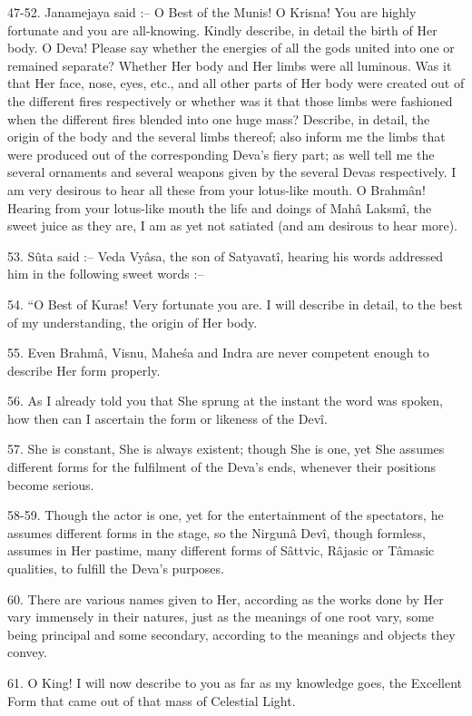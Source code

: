 47-52. Janamejaya said :-- O Best of the Munis! O Krisna! You are highly fortunate and you are all-knowing. Kindly describe, in detail the birth of Her body. O Deva! Please say whether the energies of all the gods united into one or remained separate? Whether Her body and Her limbs were all luminous. Was it that Her face, nose, eyes, etc., and all other parts of Her body were created out of the different fires respectively or whether was it that those limbs were fashioned when the different fires blended into one huge mass? Describe, in detail, the origin of the body and the several limbs thereof; also inform me the limbs that were produced out of the corresponding Deva's fiery part; as well tell me the several ornaments and several weapons given by the several Devas respectively. I am very desirous to hear all these from your lotus-like mouth. O Brahm\^an! Hearing from your lotus-like mouth the life and doings of Mah\^a Laksm\^i, the sweet juice as they are, I am as yet not satiated (and am desirous to hear more).

53. S\^uta said :-- Veda Vy\^asa, the son of Satyavat\^i, hearing his words addressed him in the following sweet words :--

54. ``O Best of Kuras! Very fortunate you are. I will describe in detail, to the best of my understanding, the origin of Her body.

55. Even Brahm\^a, Visnu, Mahe\'sa and Indra are never competent enough to describe Her form properly.

56. As I already told you that She sprung at the instant the word was spoken, how then can I ascertain the form or likeness of the Dev\^i.

57. She is constant, She is always existent; though She is one, yet She assumes different forms for the fulfilment of the Deva's ends, whenever their positions become serious.

58-59. Though the actor is one, yet for the entertainment of the spectators, he assumes different forms in the stage, so the Nirgun\^a Dev\^i, though formless, assumes in Her pastime, many different forms of S\^attvic, R\^ajasic or T\^amasic qualities, to fulfill the Deva's purposes.

60. There are various names given to Her, according as the works done by Her vary immensely in their natures, just as the meanings of one root vary, some being principal and some secondary, according to the meanings and objects they convey.

61. O King! I will now describe to you as far as my knowledge goes, the Excellent Form that came out of that mass of Celestial Light.

